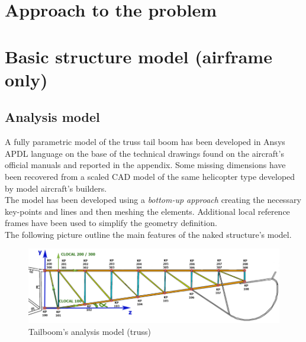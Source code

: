 \clearpage
\section*{Approach to the problem}
\section{Basic structure model (airframe only)}
\subsection*{Analysis model}
\noindent
A fully parametric model of the truss tail boom has been developed in Ansys APDL language on the base of the technical drawings found on the aircraft's official manuals and reported in the appendix. Some missing dimensions have been recovered from a scaled CAD model of the same helicopter type developed by model aircraft's builders. \\
The model has been developed using a \emph{bottom-up approach} creating the necessary key-points and lines and then meshing the elements. Additional local reference frames have been used to simplify the geometry definition. \\
The following picture outline the main features of the naked structure's model. \\

 \medskip
 \begin{figure}[h]
 	\begin{center}
 		\centering  		 		
 		\includegraphics[width=1\linewidth]{PICTURES/2_Lama_truss/PNG/tail_complete_mod.png}
 	\end{center}
 	\caption {Tailboom's analysis model (truss)}
 \end{figure}
 
